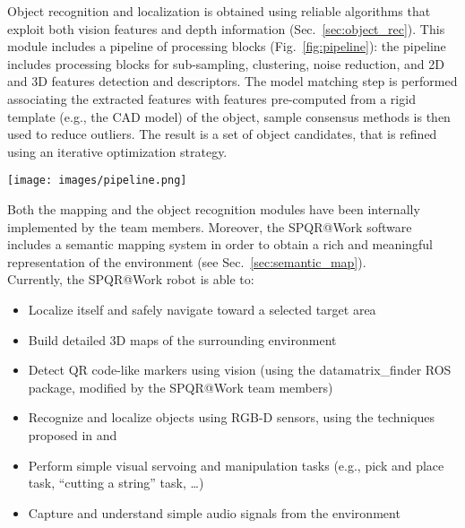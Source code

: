\documentclass[conference]{IEEEtran}
\begin{document}
Object recognition and localization is obtained using reliable algorithms that exploit both vision features and depth information (Sec.~\ref{sec:object_rec}). This module includes a pipeline of processing blocks (Fig.~\ref{fig:pipeline}): the pipeline includes processing blocks for sub-sampling, clustering, noise reduction, and 2D and 3D features detection and descriptors. The model matching step is performed associating the extracted features with features pre-computed from a rigid template (e.g., the CAD model) of the object, sample consensus methods is then used to reduce outliers. The result is a set of object candidates, that is refined using an iterative optimization strategy. 

\begin{figure*}[t!]
\begin{center}
\texttt{[image: images/pipeline.png]}
\end{center}
\caption{The SPQR@Work object recognition and localization pipeline.}\label{fig:pipeline}
\end{figure*}

Both the mapping and the object recognition modules have been internally implemented by the team members.
Moreover, the SPQR@Work software includes a semantic mapping system in order to obtain a rich and meaningful representation of the environment (see Sec.~\ref{sec:semantic_map}).\\

Currently, the SPQR@Work robot is able to:

\begin{itemize}
 \item Localize itself and safely navigate toward a selected target area
 \item Build detailed 3D maps of the surrounding environment
 \item Detect QR code-like markers using vision (using the datamatrix\_finder ROS package, modified by the SPQR@Work team members)
 \item Recognize and localize objects using RGB-D sensors, using the techniques proposed in \cite{antonelloVISIGRAPP2014} and \cite{prettoCASE2013}
 \item Perform simple visual servoing and manipulation tasks (e.g., pick and place task, ``cutting a string'' task, \dots)
 \item Capture and understand simple audio signals from the environment
\end{itemize}
\end{document}
